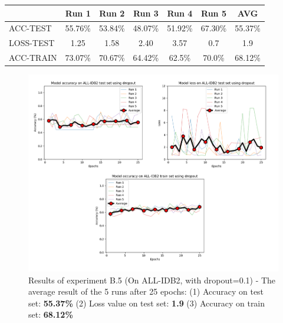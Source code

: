 \documentclass[11pt, openany]{report}
\theoremstyle{plain}
\theoremstyle{definition}
\theoremstyle{remark}
\begin{document}
\begin{center}
\begin{tabular}{|l|c|c|c|c|c|c|}
  \hline
   & \textbf{Run 1} & \textbf{Run 2} & \textbf{Run 3} & \textbf{Run 4} & \textbf{Run 5} & \textbf{AVG}\\
  \hline
  ACC-TEST & 55.76\% & 53.84\% & 48.07\% & 51.92\% & 67.30\% & 55.37\% \\
  LOSS-TEST & 1.25 & 1.58 & 2.40 & 3.57  & 0.7 & 1.9 \\ 
  ACC-TRAIN & 73.07\% & 70.67\% & 64.42\% & 62.5\% & 70.0\% & 68.12\% \\ 
  \hline
\end{tabular}
\label{table:results-B5}
\end{center}


\begin{figure}[H]
  \centering
  \includegraphics[scale=0.45]{Code/ch6-LeukemiaSubtypes/figures_result/ALL_IDB2/all_idb2-dropout.PNG}
  \caption{Results of experiment B.5 (On ALL-IDB2, with dropout=0.1) - The average result of the 5 runs after 25 epochs: (1) Accuracy on test set: \textbf{55.37\%} (2) Loss value on test set: \textbf{1.9} (3) Accuracy on train set: \textbf{68.12\%}}
  \label{fig:results-B5}
\end{figure}
\end{document}
